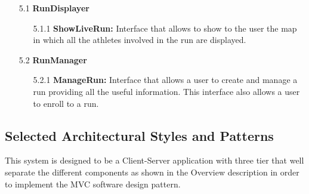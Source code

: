 \begin{center}
\begin{enumerate}
\item[5.1] \textbf{RunDisplayer}
	\begin{enumerate}[nolistsep]
		\item[5.1.1] \textbf{ShowLiveRun:} Interface that allows to show to the user the map in which all the athletes involved in the run are displayed.
	\end{enumerate}	

\item[5.2] \textbf{RunManager}
	\begin{enumerate}[nolistsep]
		\item[5.2.1] \textbf{ManageRun:} Interface that allows a user to create and manage a run providing all the useful information. This interface also allows a user to enroll to a run.
	\end{enumerate}		
\end{enumerate}
\clearpage
\end{center}



\subsection{Selected Architectural Styles and Patterns}

This system is designed to be a Client-Server application with three tier that well separate the different components as shown in the Overview description in order to implement the MVC software design pattern.

